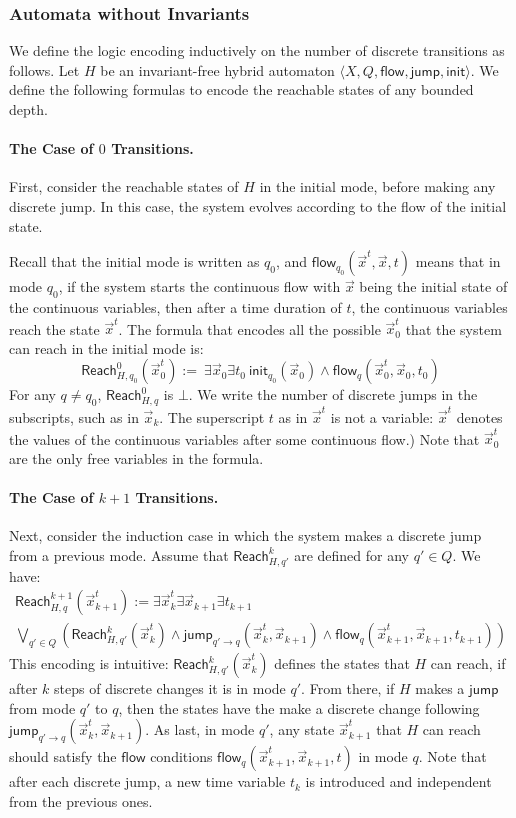 \documentclass[envcountsect]{llncs}
\newcommand{\flow}{\mathsf{flow}}
\newcommand{\jump}{\mathsf{jump}}
\newcommand{\init}{\mathsf{init}}
\newcommand{\reach}{\mathsf{Reach}}
\begin{document}
\subsubsection{Automata without Invariants} We define
the logic encoding inductively on the number of discrete transitions as
follows. Let $H$ be an invariant-free hybrid automaton $\langle X, Q, \flow,
\jump,\init\rangle$. We define the following formulas to encode the reachable
states of any bounded depth.
\paragraph{The Case of $0$ Transitions.} First, consider the reachable states of
$H$ in the initial mode, before making any discrete jump. In this case, the
system
evolves according to the flow of the initial state.

Recall that the initial mode is written as $q_0$, and $\flow_{q_0}(\vec x^t,
\vec x, t)$ means that in mode $q_0$, if the system starts the continuous flow
with $\vec x$ being the initial state of the continuous variables, then after a
time duration of $t$, the continuous variables reach the state $\vec x^t$. The
formula that encodes all the possible $\vec x_0^t$ that the system can
reach in the initial mode is:
$$\reach^0_{H,q_0} (\vec x_0^t):=\ \exists \vec x_0 \exists t_0\
\init_{q_0}(\vec
x_0)\wedge \flow_q(\vec x_0^t, \vec x_0, t_0)$$
For any $q\neq q_0$, $\reach^0_{H,q}$ is $\bot$.
We write the number of
discrete jumps in the subscripts, such as in $\vec
x_k$. The superscript $t$ as in $\vec x^t$ is not a variable: $\vec x^t$ denotes
the values of the continuous variables after some continuous flow.) Note that
$\vec x_0^t$ are the only free variables in the formula.

\paragraph{The Case of $k+1$ Transitions.} Next, consider the induction case in
which
the system makes a discrete jump from a previous mode. Assume that
$\reach^k_{H,q'}$ are defined for any $q'\in Q$. We have:
\begin{multline*}
\reach^{k+1}_{H,q}(\vec x_{k+1}^t):=  \exists \vec x_k^t\exists \vec
x_{k+1}\exists t_{k+1}\ \\
\bigvee_{q'\in Q} (\reach^k_{H,q'} (\vec x_k^t) \wedge \jump_{q'\rightarrow
q}(\vec x_k^t, \vec x_{k+1}) \wedge \flow_{q}(\vec x_{k+1}^t, \vec x_{k+1},
t_{k+1}))
\end{multline*}
This encoding is intuitive: $\reach_{H,q'}^k(\vec x_k^t)$ defines the states
that $H$ can reach, if after $k$ steps of discrete changes it is in mode $q'$.
From there, if $H$ makes a $\jump$ from mode $q'$ to $q$, then the states have
the make a discrete change following $\jump_{q'\rightarrow q}(\vec x_k^t, \vec
x_{k+1})$. As last, in mode $q'$, any state $\vec x_{k+1}^t$ that $H$ can reach
should satisfy the $\flow$ conditions $\flow_q(\vec x_{k+1}^t, \vec x_{k+1}, t)$
in mode $q$. Note that after each discrete jump, a new time variable $t_k$ is
introduced and independent from the previous ones.
\end{document}
